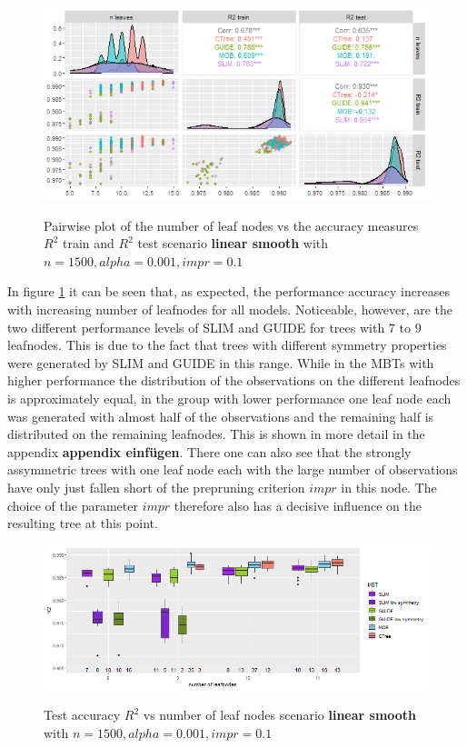 \begin{figure}[!htb] 
\caption{Pairwise plot of the number of leaf nodes vs the accuracy measures $R^2$ train and $R^2$ test scenario \textbf{linear smooth} with $n=1500, alpha = 0.001, impr = 0.1$}
    \includegraphics[width=16cm]{Figures/simulations/batchtools/basic_scenarios/linear_smooth/ls_1000_standalone_r2_nleaves.png}
    \label{fig:ls_1000_standalone_r2_nleaves}
\end{figure} 


In figure \ref{fig:ls_1000_standalone_r2_nleaves} it can be seen that, as expected, the performance accuracy increases with increasing number of leafnodes for all models. Noticeable, however, are the two different performance levels of SLIM and GUIDE for trees with $7$ to $9$ leafnodes. This is due to the fact that trees with different symmetry properties were generated by SLIM and GUIDE in this range. While in the MBTs with higher performance the distribution of the observations on the different leafnodes is approximately equal, in the group with lower performance one leaf node each was generated with almost half of the observations and the remaining half is distributed on the remaining leafnodes. This is shown in more detail in the appendix \textbf{appendix einfügen}. There one can also see that the strongly assymmetric trees with one leaf node each with the large number of observations have only just fallen short of the prepruning criterion $impr$ in this node. The choice of the parameter $impr$ therefore also has a decisive influence on the resulting tree at this point.





\begin{figure}[!htb] 
\caption{Test accuracy $R^2$ vs number of leaf nodes scenario \textbf{linear smooth} with $n=1500, alpha = 0.001, impr = 0.1$}
    \includegraphics[width=16cm]{Figures/simulations/batchtools/basic_scenarios/linear_smooth/ls_1000_standalone_r2_test.png}
    \label{fig:ls_1000_standalone_r2_test}
\end{figure} 

